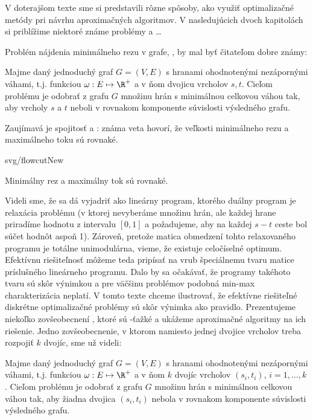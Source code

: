 V doterajšom texte sme si predstavili rôzne spôsoby, ako využiť optimalizačné metódy pri návrhu aproximačných
algoritmov. V nasledujúcich dvoch kapitolách si priblížime niektoré známe problémy a \ldots


Problém nájdenia minimálneho rezu v grafe, \mincut, by mal byť čitateľom dobre známy:

\begin{framed}
  \begin{dfn}
    \label{dfn:mincut}
    Majme daný jednoduchý graf $G=(V,E)$ s hranami ohodnotenými nezápornými váhami, t.j. funkciou
    $\omega:E\mapsto \R^+$ a v ňom dvojicu vrcholov $s,t$. Cieľom problému
    \mincut je odobrať z grafu $G$ množinu hrán s minimálnou celkovou váhou tak, aby
     vrcholy $s$ a $t$ neboli v rovnakom komponente súvislosti výsledného grafu.
  \end{dfn}
\end{framed}

Zaujímavá je spojitosť \mincut a \maxflow: známa veta hovorí, že veľkosti minimálneho rezu a maximálneho toku 
sú rovnaké. 


\begin{myfig}{\textwidth}{svg/flowcutNew}
  \centerline{Minimálny rez a maximálny tok sú rovnaké.}
\end{myfig}

Videli sme, že \maxflow sa dá vyjadriť ako lineárny program, ktorého duálny program
je relaxácia problému \mincut (v ktorej nevyberáme množinu hrán, ale každej hrane priradíme hodnotu
z intervalu $[0,1]$ a požadujeme, aby na každej $s-t$ ceste bol súčet hodnôt aspoň 1).
Zároveň, pretože matica obmedzení tohto relaxovaného programu je totálne unimodulárna, vieme,
že existuje celočíselné optimum. Efektívnu riešiteľnosť \mincut môžeme teda pripísať na vrub
špeciálnemu tvaru matice príslušného lineárneho programu. Dalo by sa očakávať, 
že programy takéhoto tvaru sú skôr výnimkou a pre väčšinu problémov podobná min-max charakterizácia
neplatí. V tomto texte chceme ilustrovať, že efektívne riešiteľné 
diskrétne optimalizačné problémy sú skôr výnimka ako pravidlo.
Prezentujeme niekoľko zovšeobecnení \mincut, ktoré sú \NP-ťažké
a ukážeme aproximačné algoritmy na ich riešenie.
Jedno zovšeobecnenie, v ktorom namiesto jednej dvojice vrcholov treba rozpojiť $k$ dvojíc, sme už videli:


\begin{framed}
  \begin{dfn}
    \label{dfn:multicut}
    Majme daný jednoduchý graf $G=(V,E)$ s hranami ohodnotenými nezápornými váhami, t.j. funkciou
    $\omega:E\mapsto \R^+$ a v ňom $k$ dvojíc vrcholov $(s_i,t_i)$, $i=1,\ldots,k$. Cieľom problému
    \minmulticut je odobrať z grafu $G$ množinu hrán s minimálnou celkovou váhou tak, aby
    žiadna dvojica $(s_i,t_i)$ nebola v rovnakom komponente súvislosti výsledného grafu.
  \end{dfn}
\end{framed}

